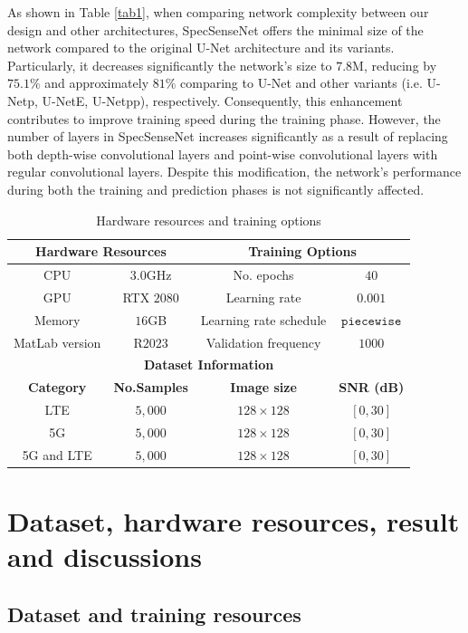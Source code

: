 \documentclass[journal]{IEEEtran} %
\begin{document}
As shown in Table \ref{tab1}, when comparing network complexity between our design and other architectures, SpecSenseNet offers the minimal size of the network compared to the original U-Net architecture and its variants. Particularly, it decreases significantly the network's size to $7.8$M, reducing by $75.1\%$ and approximately $81\%$ comparing to U-Net and other variants (i.e. U-Netp, U-NetE, U-Netpp), respectively. Consequently, this enhancement contributes to improve training speed during the training phase. However, the number of layers in SpecSenseNet increases significantly as a result of replacing both depth-wise convolutional layers and point-wise convolutional layers with regular convolutional layers. Despite this modification, the network's performance during both the training and prediction phases is not significantly affected.

\begin{table}[!t]
\centering
\caption{Hardware resources and training options}
\label{tab2}
\begin{tabular}{c|c|c|c}
\hline
\multicolumn{2}{c|}{\textbf{Hardware Resources}} & \multicolumn{2}{c}{\textbf{Training Options}} \\ \hline
CPU & $3.0$GHz & No. epochs & $40$ \\ 
GPU & RTX $2080$ & Learning rate & $0.001$ \\
Memory & $16$GB & Learning rate schedule & $\mathtt{piecewise}$ \\ 
MatLab version & R$2023$ & Validation frequency & $1000$ \\
\hline
\multicolumn{4}{c}{\textbf{Dataset Information}} \\
\hline
\textbf{Category} & \textbf{No.Samples} & \textbf{Image size} & \textbf{SNR (dB)}\\
\hline
LTE         & $5,000$ & $128 \times 128$ & $[0, 30]$ \\
5G          & $5,000$ & $128 \times 128$ & $[0, 30]$ \\
5G and LTE  & $5,000$ & $128 \times 128$ & $[0, 30]$ \\
\hline
\end{tabular}
\end{table}

\section{Dataset, hardware resources, result and discussions}
\subsection{Dataset and training resources}
\end{document}
